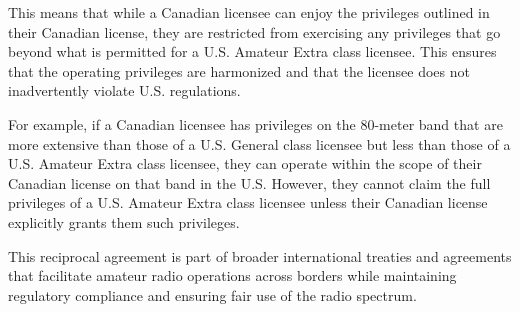 This means that while a Canadian licensee can enjoy the privileges outlined in their Canadian license, they are restricted from exercising any privileges that go beyond what is permitted for a U.S. Amateur Extra class licensee. This ensures that the operating privileges are harmonized and that the licensee does not inadvertently violate U.S. regulations.

For example, if a Canadian licensee has privileges on the 80-meter band that are more extensive than those of a U.S. General class licensee but less than those of a U.S. Amateur Extra class licensee, they can operate within the scope of their Canadian license on that band in the U.S. However, they cannot claim the full privileges of a U.S. Amateur Extra class licensee unless their Canadian license explicitly grants them such privileges.

This reciprocal agreement is part of broader international treaties and agreements that facilitate amateur radio operations across borders while maintaining regulatory compliance and ensuring fair use of the radio spectrum.

